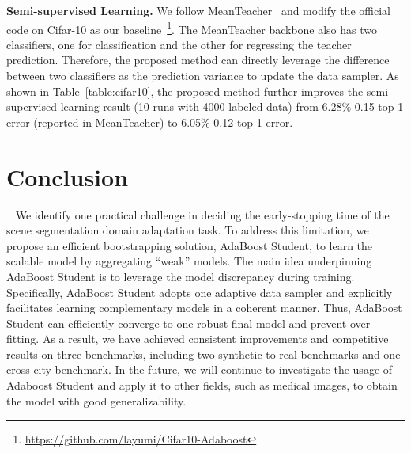 \documentclass[journal]{IEEEtran}
\begin{document}
\noindent\textbf{Semi-supervised Learning.} We follow MeanTeacher~\cite{tarvainen2017mean} and modify the official code on Cifar-10 as our baseline~\footnote{\url{https://github.com/layumi/Cifar10-Adaboost}}. The MeanTeacher backbone also has two classifiers, one for classification and the other for regressing the teacher prediction. Therefore, the proposed method can directly leverage the difference between two classifiers as the prediction variance to update the data sampler. As shown in Table~\ref{table:cifar10}, the proposed method further improves the semi-supervised learning result (10 runs with 4000 labeled data) from 6.28\%  0.15 top-1 error (reported in MeanTeacher) to 6.05\%  0.12 top-1 error. 

\section{Conclusion}~\label{sec:conclusion}
We identify one practical challenge in deciding the early-stopping time of the scene segmentation domain adaptation task. 
To address this limitation, we propose an efficient bootstrapping solution, AdaBoost Student, to learn the scalable model by aggregating ``weak'' models. 
The main idea underpinning AdaBoost Student is to leverage the model discrepancy during training. Specifically, AdaBoost Student adopts one adaptive data sampler and explicitly facilitates learning complementary models in a coherent manner. Thus, AdaBoost Student can efficiently converge to one robust final model and prevent over-fitting. 
As a result, we have achieved consistent improvements and competitive results on three benchmarks, including two synthetic-to-real benchmarks and one cross-city benchmark. In the future, we will continue to investigate the usage of Adaboost Student and apply it to other fields, such as medical images, to obtain the model with good generalizability.




\end{document}
